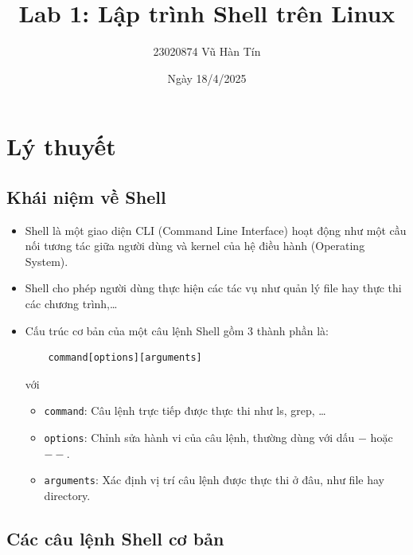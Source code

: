 \documentclass{article}
\title{Lab 1: Lập trình Shell trên Linux
}
\author{23020874 Vũ Hàn Tín}
\date{Ngày 18/4/2025}
\begin{document}
\maketitle
\section{Lý thuyết}
\subsection{Khái niệm về Shell}
\begin{itemize}
    \item Shell là một giao diện CLI (Command Line Interface) hoạt động như một cầu nối tương tác giữa người dùng và kernel của hệ điều hành (Operating System).
    \item Shell cho phép người dùng thực hiện các tác vụ như quản lý file hay thực thi các chương trình,\dots
    \item Cấu trúc cơ bản của một câu lệnh Shell gồm 3 thành phần là:
    \begin{center}
    \begin{verbatim}
    command[options][arguments]
    \end{verbatim}
    \end{center}
    với \begin{itemize}
        \item \verb|command|: Câu lệnh trực tiếp được thực thi như ls, grep, \dots
        \item \verb|options|: Chỉnh sửa hành vi của câu lệnh, thường dùng với dấu $-$ hoặc $--$.
        \item \verb|arguments|: Xác định vị trí câu lệnh được thực thi ở đâu, như file hay directory.
        \end{itemize}
 \end{itemize}
 \subsection{Các câu lệnh Shell cơ bản}
\end{document}
